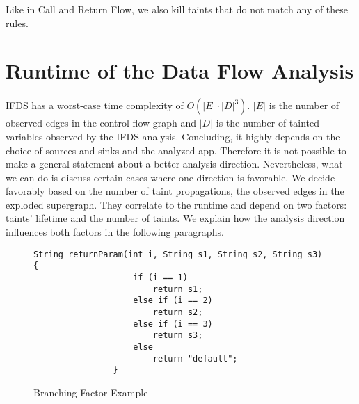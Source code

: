 \documentclass[../draft.tex]{subfiles}
\begin{document}
    Like in Call and Return Flow, we also kill taints that do not match any of these rules.
    
    \section{Runtime of the Data Flow Analysis}\label{s:complexity}
    IFDS has a worst-case time complexity of $O(|E| \cdot |D|^3)$. $|E|$ is the number of observed edges in the control-flow graph and $|D|$ is the number of tainted variables observed by the IFDS analysis. Concluding, it highly depends on the choice of sources and sinks and the analyzed app. 
    Therefore it is not possible to make a general statement about a better analysis direction. 
    Nevertheless, what we can do is discuss certain cases where one direction is favorable. We decide favorably based on the number of taint propagations, the observed edges in the exploded supergraph. They correlate to the runtime and depend on two factors: taints' lifetime and the number of taints. We explain how the analysis direction influences both factors in the following paragraphs.

    \begin{figure}[ht]
        \centering
        \begin{adjustbox}{max width=\textwidth}
            \begin{lstlisting}[gobble=16]
                String returnParam(int i, String s1, String s2, String s3) {
                    if (i == 1)
                        return s1;
                    else if (i == 2)
                        return s2;
                    else if (i == 3)
                        return s3;
                    else
                        return "default";
                }
            \end{lstlisting}    
        \end{adjustbox}
        \caption{Branching Factor Example}
        \label{lst:branching}
    \end{figure}
\end{document}
